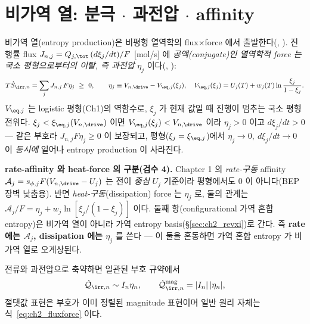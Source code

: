 \section{비가역 열: 분극 $\cdot$ 과전압 $\cdot$ affinity}\label{sec:ch2_irr}
비가역 열(entropy production)은 비평형 열역학의 flux$\times$force 에서 출발한다(\cite{degrootmazur1962,onsager1931}, ).
진행률 flux $J_{n,j}=Q_{j,\tot}\,(d\xi_j/dt)/F$ [mol/s] 에 \emph{공액(conjugate)인 열역학적 force 는 국소
평형으로부터의 이탈, 즉 과전압} $\eta_j$ 이다(\cite{newman2004,bardfaulkner}, ):
\begin{equation}
T\dot S_{\irr,n}=\sum_j J_{n,j}\,F\eta_j\ \ge\ 0,\qquad
\eta_j\equiv V_{n,\drive}-V_{\eq,j}(\xi_j),\quad
V_{\eq,j}(\xi_j)=U_j(T)+w_j(T)\ln\frac{\xi_j}{1-\xi_j}.
\label{eq:ch2_fluxforce}
\end{equation}
$V_{\eq,j}$ 는 logistic 평형(Ch1)의 역함수로, $\xi_j$ 가 현재 값일 때 진행이 멈추는 국소 평형 전위다.
$\xi_j<\xi_{\eq,j}(V_{n,\drive})$ 이면 $V_{\eq,j}(\xi_j)<V_{n,\drive}$ 이라 $\eta_j>0$ 이고 $d\xi_j/dt>0$ —
같은 부호라 $J_{n,j}F\eta_j\ge0$ 이 보장되고, 평형($\xi_j=\xi_{\eq,j}$)에서 $\eta_j\to0,\ d\xi_j/dt\to0$ 이
\emph{동시에} 일어나 entropy production 이 사라진다.
\begin{boundbox}
\textbf{rate-affinity 와 heat-force 의 구분(검수 4).} Chapter 1 의 \emph{rate-구동} affinity
$\mathcal A_j=s_{\phi,j}F(V_{n,\drive}-U_j)$ 는 전이 \emph{중심} $U_j$ 기준이라 평형에서도 0 이 아니다(BEP
장벽 낮춤용). 반면 \emph{heat-구동}(dissipation) force 는 $\eta_j$ 로, 둘의 관계는
$\mathcal A_j/F=\eta_j+w_j\ln[\xi_j/(1-\xi_j)]$ 이다. 둘째 항(configurational 가역 혼합 entropy)은 비가역
열이 아니라 가역 entropy basis(\S\ref{sec:ch2_revxi})로 간다. 즉 \textbf{rate 에는 $\mathcal A_j$,
dissipation 에는 $\eta_j$} 를 쓴다 — 이 둘을 혼동하면 가역 혼합 entropy 가 비가역 열로 오계상된다.
\end{boundbox}
전류와 과전압으로 축약하면 일관된 부호 규약에서
\begin{equation}
\dot{\mathcal Q}_{\irr,n}\sim I_n\eta_n,\qquad
\dot{\mathcal Q}_{\irr,n}^{\mathrm{mag}}=|I_n|\,|\eta_n|,
\label{eq:ch2_Ieta}
\end{equation}
절댓값 표현은 부호가 이미 정렬된 magnitude 표현이며 일반 원리 자체는 식~\eqref{eq:ch2_fluxforce} 이다.

